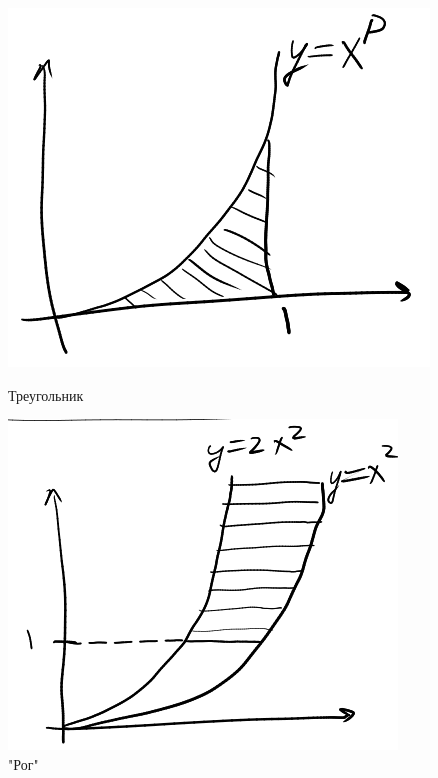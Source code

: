 \documentclass[english]{article}
\theoremstyle{plain}
\theoremstyle{remark}
\theoremstyle{definition}
\begin{document}
\begin{figure}[H]
\centering
\begin{minipage}{20em}
\centering
\includegraphics[scale=0.3]{5_5.png}
\caption{Треугольник}
\end{minipage}
\begin{minipage}{20em}
\includegraphics[scale=0.3]{5_7.png}
\caption{"Рог"}
\end{minipage}
\end{figure}
\end{document}
